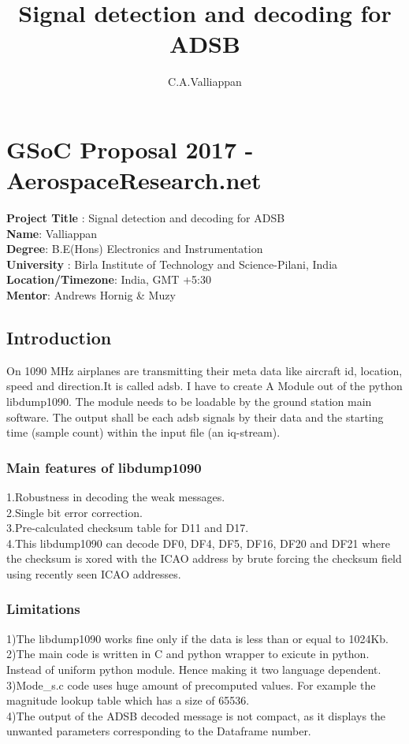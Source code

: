 \documentclass[11pt,a4paper]{report}
\author{C.A.Valliappan}
\title{Signal detection and decoding for ADSB}
\begin{document}
\chapter{GSoC Proposal 2017 - AerospaceResearch.net}

\textbf{Project Title }: Signal detection and decoding for ADSB\\
\textbf{Name}: Valliappan\\
\textbf{Degree}: B.E(Hons) Electronics and Instrumentation\\
\textbf{University }: Birla Institute of Technology and Science-Pilani, India\\
\textbf{Location/Timezone}: India, GMT +5:30\\ 
\textbf{Mentor}: Andrews Hornig \& Muzy\\

\section{Introduction}
On 1090 MHz airplanes are transmitting their meta data like aircraft id, location, speed and direction.It is called adsb. I have to create A Module out of the python libdump1090. The module needs to be loadable by the ground station main software. The output shall be each adsb signals by their data and the starting time (sample count) within the input file (an iq-stream).

\subsection{Main features of libdump1090}
1.Robustness in decoding the weak messages.\\
2.Single bit error correction.\\ 
3.Pre-calculated checksum table for D11 and D17.\\
4.This libdump1090 can decode DF0, DF4, DF5, DF16, DF20 and DF21 where the checksum is xored with the ICAO address by brute forcing the checksum field using recently seen ICAO addresses.

\subsection{Limitations}

1)The libdump1090 works fine only if the data is less than or equal to 1024Kb.\\ 2)The main code is written in C and python wrapper to exicute in python. Instead of uniform python module. Hence making it two language dependent.\\
3)Mode\_s.c code uses huge amount of precomputed values. For example the magnitude lookup table which has a size of 65536.\\
4)The output of the ADSB decoded message is not compact, as it displays the unwanted parameters corresponding to the Dataframe number. 
\end{document}
